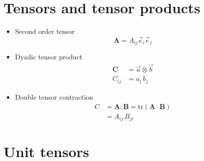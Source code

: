 \documentclass[fleqn, colorlinks]{goose-article}
\newcommand\T[1]{\underline{\bm{{#1}}}}
\begin{document}
\appendix

\vfill\newpage

\section{Tensors and tensor products}
\label{sec:nomenclature:tensor}

\begin{itemize}

    \item Second order tensor
    \begin{equation}
        \T{A} = A_{ij} \vec{e}_i \vec{e}_j
    \end{equation}

    \item Dyadic tensor product
    \begin{align}
        \T{C} &= \vec{a} \otimes \vec{b} \\
        C_{ij} &= a_{i} \, b_{j}
    \end{align}

    \item Double tensor contraction
    \begin{align}
        C
        &= \T{A} : \T{B} = \mathrm{tr} \left( \T{A} \cdot \T{B} \right) \\
        &= A_{ij} \, B_{ji}
    \end{align}

\end{itemize}

\section{Unit tensors}
\label{sec:nomenclature:unit}
\end{document}
